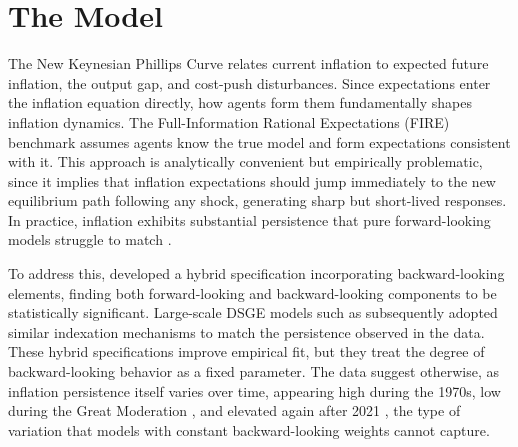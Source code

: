 \documentclass[10pt]{article}
\begin{document}

\section{The Model}
\label{sec:model}

The New Keynesian Phillips Curve relates current inflation to expected future inflation, the output gap, and cost-push disturbances. Since expectations enter the inflation equation directly, how agents form them fundamentally shapes inflation dynamics. The Full-Information Rational Expectations (FIRE) benchmark assumes agents know the true model and form expectations consistent with it. This approach is analytically convenient but empirically problematic, since it implies that inflation expectations should jump immediately to the new equilibrium path following any shock, generating sharp but short-lived responses. In practice, inflation exhibits substantial persistence that pure forward-looking models struggle to match \citep{fuhrer1995}.

To address this, \citet{gali1999} developed a hybrid specification incorporating backward-looking elements, finding both forward-looking and backward-looking components to be statistically significant. Large-scale DSGE models such as \citet{smets2007} subsequently adopted similar indexation mechanisms to match the persistence observed in the data. These hybrid specifications improve empirical fit, but they treat the degree of backward-looking behavior as a fixed parameter. The data suggest otherwise, as inflation persistence itself varies over time, appearing high during the 1970s, low during the Great Moderation \citep{beechey2012}, and elevated again after 2021 \citep{coibion2025inflation}, the type of variation that models with constant backward-looking weights cannot capture.
\end{document}
